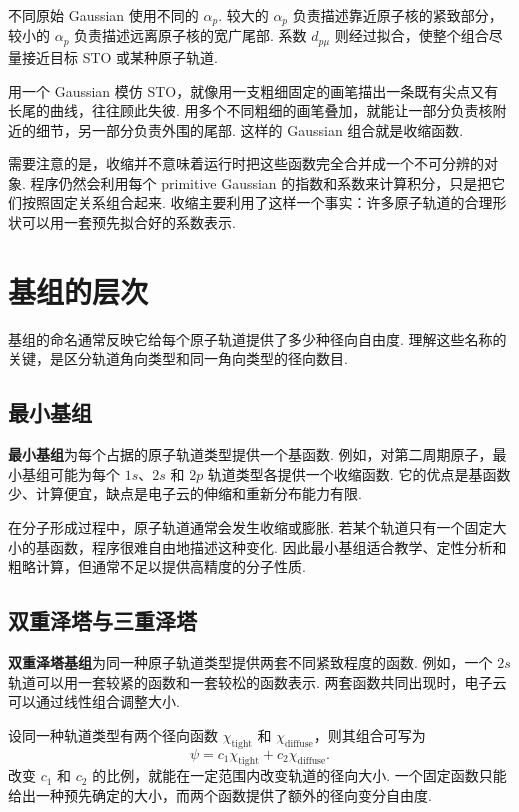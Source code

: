 \documentclass[UTF8,11pt,a4paper,openany]{ctexbook}
\newcommand{\term}[1]{\textbf{#1}}
\begin{document}
不同原始 Gaussian 使用不同的 $\alpha_p$. 较大的 $\alpha_p$ 负责描述靠近原子核的紧致部分，较小的 $\alpha_p$ 负责描述远离原子核的宽广尾部. 系数 $d_{p\mu}$ 则经过拟合，使整个组合尽量接近目标 STO 或某种原子轨道. 

\begin{analogybox}
用一个 Gaussian 模仿 STO，就像用一支粗细固定的画笔描出一条既有尖点又有长尾的曲线，往往顾此失彼. 用多个不同粗细的画笔叠加，就能让一部分负责核附近的细节，另一部分负责外围的尾部. 这样的 Gaussian 组合就是收缩函数. 
\end{analogybox}

需要注意的是，收缩并不意味着运行时把这些函数完全合并成一个不可分辨的对象. 程序仍然会利用每个 primitive Gaussian 的指数和系数来计算积分，只是把它们按照固定关系组合起来. 收缩主要利用了这样一个事实：许多原子轨道的合理形状可以用一套预先拟合好的系数表示. 

\section{基组的层次}

基组的命名通常反映它给每个原子轨道提供了多少种径向自由度. 理解这些名称的关键，是区分轨道角向类型和同一角向类型的径向数目. 

\subsection{最小基组}

\term{最小基组}为每个占据的原子轨道类型提供一个基函数. 例如，对第二周期原子，最小基组可能为每个 $1s$、$2s$ 和 $2p$ 轨道类型各提供一个收缩函数. 它的优点是基函数少、计算便宜，缺点是电子云的伸缩和重新分布能力有限. 

在分子形成过程中，原子轨道通常会发生收缩或膨胀. 若某个轨道只有一个固定大小的基函数，程序很难自由地描述这种变化. 因此最小基组适合教学、定性分析和粗略计算，但通常不足以提供高精度的分子性质. 

\subsection{双重泽塔与三重泽塔}

\term{双重泽塔基组}为同一种原子轨道类型提供两套不同紧致程度的函数. 例如，一个 $2s$ 轨道可以用一套较紧的函数和一套较松的函数表示. 两套函数共同出现时，电子云可以通过线性组合调整大小. 

\begin{derivationbox}
设同一种轨道类型有两个径向函数 $\chi_{\mathrm{tight}}$ 和 $\chi_{\mathrm{diffuse}}$，则其组合可写为
\[
\psi=c_1\chi_{\mathrm{tight}}+c_2\chi_{\mathrm{diffuse}}.
\]
改变 $c_1$ 和 $c_2$ 的比例，就能在一定范围内改变轨道的径向大小. 一个固定函数只能给出一种预先确定的大小，而两个函数提供了额外的径向变分自由度. 
\end{derivationbox}
\end{document}
